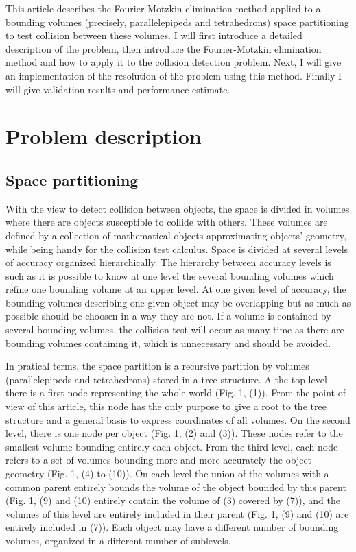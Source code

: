 \documentclass[12pt, a4paper]{article}
\begin{document}
This article describes the Fourier-Motzkin elimination method applied to a bounding volumes (precisely, parallelepipeds and tetrahedrons) space partitioning to test collision between these volumes. I will first introduce a detailed description of the problem, then introduce the Fourier-Motzkin elimination method and how to apply it to the collision detection problem. Next, I will give an implementation of the resolution of the problem using this method. Finally I will give validation results and performance estimate.

\section{Problem description}

\subsection{Space partitioning}

With the view to detect collision between objects, the space is divided in volumes where there are objects susceptible to collide with others. These volumes are defined by a collection of mathematical objects approximating objects' geometry, while being handy for the collision test calculus. Space is divided at several levels of accuracy organized hierarchically. The hierarchy between accuracy levels is such as it is possible to know at one level the several bounding volumes which refine one bounding volume at an upper level. At one given level of accuracy, the bounding volumes describing one given object may be overlapping but as much as possible should be choosen in a way they are not. If a volume is contained by several bounding volumes, the collision test will occur as many time as there are bounding volumes containing it, which is unnecessary and should be avoided.

In pratical terms, the space partition is a recursive partition by volumes (parallelepipeds and tetrahedrons) stored in a tree structure. A the top level there is a first node representing the whole world (Fig. 1, (1)). From the point of view of this article, this node has the only purpose to give a root to the tree structure and a general basis to express coordinates of all volumes. On the second level, there is one node per object (Fig. 1, (2) and (3)). These nodes refer to the smallest volume bounding entirely each object. From the third level, each node refers to a set of volumes bounding more and more accurately the object geometry (Fig. 1, (4) to (10)). On each level the union of the volumes with a common parent entirely bounds the volume of the object bounded by this parent (Fig. 1, (9) and (10) entirely contain the volume of (3) covered by (7)), and the volumes of this level are entirely included in their parent (Fig. 1, (9) and (10) are entirely included in (7)). Each object may have a different number of bounding volumes, organized in a different number of sublevels.
\end{document}
